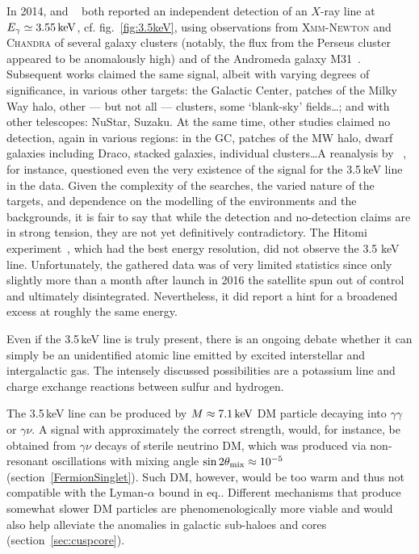 In 2014,  and ~\cite{3.5KeV} both reported an independent detection of an $X$-ray line at $E_\gamma \simeq 3.55\,{\rm keV}$, cf. fig.~\ref{fig:3.5keV},
using observations from \textsc{Xmm-Newton} and \textsc{Chandra} of several galaxy clusters (notably, the flux from the Perseus cluster appeared to be anomalously high)
and of the Andromeda galaxy M31~\cite{3.5KeV}. 
Subsequent works claimed 
the same signal, albeit with varying degrees of significance, in various other targets: the Galactic Center, patches of the Milky Way halo, other --- but not all --- clusters, some `blank-sky' fields\ldots; and with other telescopes:   {\sc NuStar}, {\sc Suzaku}. 
At the same time, other studies claimed no detection, again in various regions: in the GC, patches of the MW halo, dwarf galaxies including Draco, stacked galaxies, individual clusters\ldots A reanalysis by ~\cite{3.5KeV}, for instance, questioned even the very existence of the signal for the 3.5\,keV line in the data.
Given the complexity of the searches, the varied nature of the targets, and dependence on the modelling of the environments and the backgrounds, it is fair to say that while the detection and no-detection claims are in strong tension, they are not yet definitively contradictory.
The {\sc Hitomi} experiment~\cite{Hitomi}, which had the best energy resolution, did not observe the 3.5 keV line. Unfortunately, the gathered data was of very limited statistics since only slightly more than a month after launch in 2016 the satellite spun out of control and ultimately disintegrated.
Nevertheless, it did report a hint for a broadened excess at roughly the same energy.



\smallskip

Even if the 3.5\,keV line is truly present,
there is an ongoing debate whether it can simply be an unidentified atomic line emitted by excited interstellar and intergalactic gas. The intensely discussed possibilities are a potassium line and charge exchange reactions between sulfur and hydrogen. 


\smallskip


The 3.5\,keV line can be produced by $M\approx 7.1\,{\rm keV}$ DM particle decaying into $\gamma\gamma$ or $\gamma\nu$.  
A signal with approximately the correct strength, would, for instance, be obtained from $\gamma\nu$ decays of sterile neutrino DM, which was produced via non-resonant oscillations with mixing
angle
$\sin2\theta_{\rm mix}\approx 10^{-5}$ 
(section~\ref{FermionSinglet}). 
Such DM, however, would be too warm and thus not compatible with the Lyman-$\alpha$ bound in eq..
Different mechanisms that produce somewhat slower DM particles are phenomenologically more viable and would also help alleviate the anomalies in galactic sub-haloes and cores (section~\ref{sec:cuspcore}).

